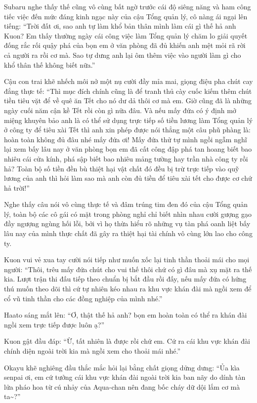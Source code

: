 \documentclass[../main.tex]{subfiles}
\begin{document}
Subaru nghe thấy thế cũng vô cùng bất ngờ trước cái độ siêng năng và ham công tiếc việc đến mức đáng kinh ngạc này của cậu Tổng quản lý, cô nàng ái ngại lên tiếng: ``Trời đất ơi, sao anh tự làm khổ bản thân mình làm cái gì thế hả anh Kuon? Em thấy thường ngày cái công việc làm Tổng quản lý chăm lo giải quyết đống rắc rối quậy phá của bọn em ở văn phòng đã đủ khiến anh mệt mỏi rã rời cả người ra rồi cơ mà. Sao tự dưng anh lại ôm thêm việc vào người làm gì cho khổ thân thế không biết nữa.''

Cậu con trai khẽ nhếch môi nở một nụ cười đầy mỉa mai, giọng điệu pha chút cay đắng thực tế: ``Thì mục đích chính cũng là để tranh thủ cày cuốc kiếm thêm chút tiền tiêu vặt để về quê ăn Tết cho nó dư dả thôi cơ mà em. Giờ cũng đã là những ngày cuối năm cận kề Tết rồi còn gì nữa đâu. Và nếu mấy đứa có ý định mở miệng khuyên bảo anh là có thể sử dụng trực tiếp số tiền lương làm Tổng quản lý ở công ty để tiêu xài Tết thì anh xin phép được nói thẳng một câu phũ phàng là: hoàn toàn không đủ đâu nhé mấy đứa ơi! Mấy đứa thử tự mình ngồi ngẫm nghĩ lại xem bấy lâu nay ở văn phòng bọn em đã cất công đập phá tan hoang biết bao nhiêu cái cửa kính, phá sập biết bao nhiêu mảng tường hay trần nhà công ty rồi hả? Toàn bộ số tiền đền bù thiệt hại vật chất đó đều bị trừ trực tiếp vào quỹ lương của anh thì hỏi làm sao mà anh còn đủ tiền để tiêu xài tết cho được cơ chứ hả trời!''

Nghe thấy câu nói vô cùng thực tế và đâm trúng tim đen đó của cậu Tổng quản lý, toàn bộ các cô gái có mặt trong phòng nghỉ chỉ biết nhìn nhau cười gượng gạo đầy ngượng ngùng hối lỗi, bởi vì họ thừa hiểu rõ những vụ tàn phá oanh liệt bấy lâu nay của mình thực chất đã gây ra thiệt hại tài chính vô cùng lớn lao cho công ty.

Kuon vui vẻ xua tay cười nói tiếp như muốn xốc lại tinh thần thoải mái cho mọi người: ``Thôi, trêu mấy đứa chút cho vui thế thôi chứ có gì đâu mà xụ mặt ra thế kia. Lượt trận thi đấu tiếp theo chuẩn bị bắt đầu rồi đấy, nếu mấy đứa có hứng thú muốn theo dõi thì cứ tự nhiên kéo nhau ra khu vực khán đài mà ngồi xem để cổ vũ tinh thần cho các đồng nghiệp của mình nhé.''

Haato sáng mắt lên: ``Ơ, thật thế hả anh? bọn em hoàn toàn có thể ra khán đài ngồi xem trực tiếp được luôn ạ?''

Kuon gật đầu đáp: ``Ừ, tất nhiên là được rồi chứ em. Cứ ra cái khu vực khán đài chính diện ngoài trời kia mà ngồi xem cho thoải mái nhé.''

Okayu khẽ nghiêng đầu thắc mắc hỏi lại bằng chất giọng dửng dưng: ``Ủa kìa senpai ơi, em cứ tưởng cái khu vực khán đài ngoài trời kia ban nãy do dính tàn lửa pháo hoa từ cú nhảy của Aqua-chan nên đang bốc cháy dữ dội lắm cơ mà ta\~{}?''
\end{document}
